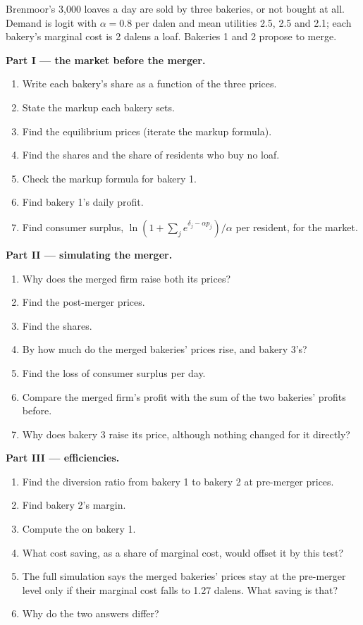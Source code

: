 \begin{problem}\label{pb:b3:oligopoly-and-collusion:bakeries}
Brenmoor's 3{,}000 loaves a day are sold by three bakeries, or not bought at all. Demand
is logit with $\alpha = 0.8$ per dalen and mean utilities 2.5, 2.5 and 2.1; each bakery's marginal cost is
2 dalens a loaf. Bakeries 1 and 2 propose to merge. %

\medskip\noindent\textbf{Part I --- the market before the merger.}
\begin{enumerate}
\item Write each bakery's share as a function of the three prices.
\item State the markup each bakery sets.
\item Find the equilibrium prices (iterate the markup formula).
\item Find the shares and the share of residents who buy no loaf.
\item Check the markup formula for bakery 1.
\item Find bakery 1's daily profit.
\item Find consumer surplus, $\ln(1 + \sum_j e^{\delta_j - \alpha p_j})/\alpha$ per resident, for the market.
\end{enumerate}

\medskip\noindent\textbf{Part II --- simulating the merger.}
\begin{enumerate}[resume]
\item Why does the merged firm raise both its prices?
\item Find the post-merger prices.
\item Find the shares.
\item By how much do the merged bakeries' prices rise, and bakery 3's?
\item Find the loss of consumer surplus per day.
\item Compare the merged firm's profit with the sum of the two bakeries' profits before.
\item Why does bakery 3 raise its price, although nothing changed for it directly?
\end{enumerate}

\medskip\noindent\textbf{Part III --- efficiencies.}
\begin{enumerate}[resume]
\item Find the diversion ratio from bakery 1 to bakery 2 at pre-merger prices.
\item Find bakery 2's margin.
\item Compute the  on bakery 1.
\item What cost saving, as a share of marginal cost, would offset it by this test?
\item The full simulation says the merged bakeries' prices stay at the pre-merger level
only if their marginal cost falls to 1.27 dalens. What saving is that?
\item Why do the two answers differ?
\end{enumerate}


\end{problem}

